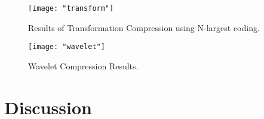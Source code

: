 \documentclass[./rarnold_project_89.tex]{subfiles}
\begin{document}
	\clearpage
	
	\begin{figure}[!htbp]
	\centering
	\texttt{[image: "transform"]}
	\captionsetup{justification=centering}
	\caption{Results of Transformation Compression using N-largest coding.} 
	\label{xform}
	\end{figure}
	
	\clearpage 
	
	\begin{figure}[!htbp]
	\centering
	\texttt{[image: "wavelet"]}
	\captionsetup{justification=centering}
	\caption{Wavelet Compression Results.} 
	\label{wavelet}
	\end{figure}
	
	\clearpage
	
  	
\section*{Discussion}
\end{document}

